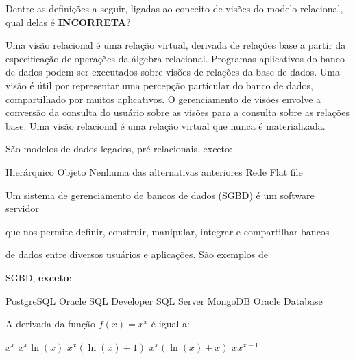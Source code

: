 \documentclass[12pt, addpoints]{exam}
\begin{document}
    \begin{questions}

    \newpage
    \question

Dentre as definições a seguir, ligadas ao conceito de visões do modelo relacional, qual delas é \textbf{INCORRETA}?


\begin{choices}
\choice Uma visão relacional é uma relação virtual, derivada de relações base a partir da especificação de operações da álgebra relacional.
\choice Programas aplicativos do banco de dados podem ser executados sobre visões de relações da base de dados.
\choice Uma visão é útil por representar uma percepção particular do banco de dados, compartilhado por muitos aplicativos.
\choice O gerenciamento de visões envolve a conversão da consulta do usuário sobre as visões para a consulta sobre as relações base.
\choice Uma visão relacional é uma relação virtual que nunca é materializada.
\end{choices}

\question

São modelos de dados legados, pré-relacionais, exceto:


\begin{choices}
\choice Hierárquico
\choice Objeto
\choice Nenhuma das alternativas anteriores
\choice Rede
\choice Flat file
\end{choices}

\question

Um sistema de gerenciamento de bancos de dados (SGBD) é um software servidor

que nos permite definir, construir, manipular, integrar e compartilhar bancos

de dados entre diversos usuários e aplicações. São exemplos de

SGBD, \textbf{exceto}:
\begin{choices}
\choice PostgreSQL
\choice Oracle SQL Developer
\choice SQL Server
\choice MongoDB
\choice Oracle Database
\end{choices}

\question

A derivada da função \( f(x) = x^x \) é igual a:
\begin{choices}
\choice \( x^x \)
\choice \( x^x \ln(x) \)
\choice \( x^x (\ln(x) + 1) \)
\choice \( x^x (\ln(x) + x) \)
\choice \( x x^{x-1} \)
\end{choices}


\end{questions}
\end{document}
